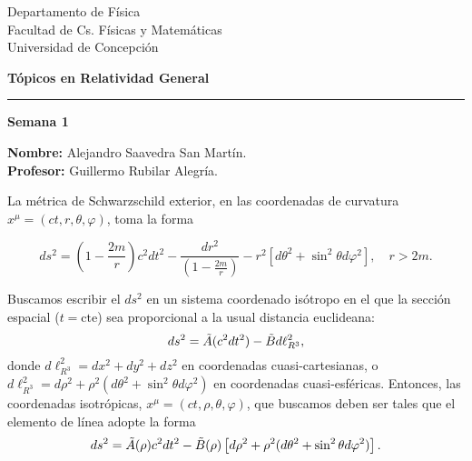 \documentclass[letterpaper,11pt]{article}
\begin{document}
\pagestyle{plain}

\begin{flushleft}\vspace{-2cm}
Departamento de Física \\
Facultad de Cs. Físicas y Matemáticas\\
Universidad de Concepción
\end{flushleft}

\begin{flushright}\vspace{-1.5cm}
\textbf{Tópicos en Relatividad General} 
\end{flushright}

\rule{\linewidth}{0.1mm}

\begin{center}
\textbf{\LARGE Semana 1}
\end{center}

\begin{flushleft}
\textbf{Nombre:} Alejandro Saavedra San Martín. \\
\textbf{Profesor:} Guillermo Rubilar Alegría.
\end{flushleft}

La métrica de Schwarzschild exterior, en las coordenadas de curvatura $x^{\mu} = (ct,r,\theta,\varphi)$, toma la forma
\begin{shaded}
\begin{equation} \label{eq:Scwarzschild-metric}
    ds^2 = \left( 1 - \frac{2m}{r}\right) c^2 dt^2 - \frac{dr^2}{\left( 1- \frac{2m}{r} \right)} - r^2 \left[ d\theta^2 + \sin^2 \theta d\varphi^2 \right], \quad r > 2m.
\end{equation}
    
\end{shaded}

Buscamos escribir el $ds^2$ en un sistema coordenado isótropo en el que la sección espacial ($t = \text{cte}$) sea proporcional a la usual distancia euclideana:
\begin{equation}
    ds^2 = \Tilde{A} (c^2 dt^2) - \Tilde{B} d\ell_{R^{3}}^2,
\end{equation}
donde $d\ell_{R^{3}}^2 = dx^2 + dy^2 + dz^2$ en coordenadas cuasi-cartesianas, o $d\ell_{R^{3}}^2 = d\rho^2 + \rho^2 (d\theta^2 + \sin^2\theta d\varphi^2)$ en coordenadas cuasi-esféricas. Entonces, las coordenadas isotrópicas, $x^{\mu} = (ct, \rho, \theta, \varphi)$, que buscamos deben ser tales que el elemento de línea adopte la forma
\begin{equation} \label{eq:pre-Sch-metric-isotropic}
    ds^2 = \Tilde{A}(\rho) c^2 dt^2 - \Tilde{B}(\rho) \left[ d\rho^2 + \rho^2 (d\theta^2 + \sin^2\theta d\varphi^2) \right].
\end{equation}
\end{document}
